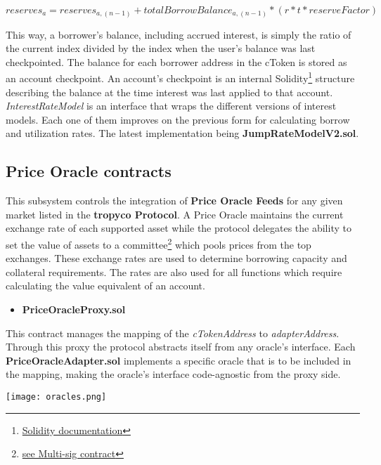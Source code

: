 \documentclass{article}
\begin{document}
\begin{center}
$reserves_{a}= reserves_{a,(n-1)}+ totalBorrowBalance_{a,(n-1)}*(r*t*reserveFactor)$
\end{center}

This way, a borrower's balance, including accrued interest, is simply the ratio of the current index divided by the index when the user's balance was last checkpointed. The balance for each borrower address in the cToken is stored as an account checkpoint. An account's checkpoint is an internal Solidity\footnote{\href{https://docs.soliditylang.org/en/v0.8.1/}{Solidity documentation}} structure describing the balance at the time interest was last applied to that account.
\\
\textit{InterestRateModel} is an interface that wraps the different versions of interest models. Each one of them improves on the previous form for calculating borrow and utilization rates. The latest implementation being \textbf{JumpRateModelV2.sol}.


\subsection{Price Oracle contracts}
This subsystem controls the integration of \textbf{Price Oracle Feeds} for any given market listed in the \textbf{tropyco Protocol}. A Price Oracle maintains the current exchange rate of each supported asset while the protocol delegates the ability to set the value of assets to a committee\footnote{\href{https://tropyco.app/docs/security}{see Multi-sig contract}} which pools prices from the top exchanges. These exchange rates are used to determine borrowing capacity and collateral requirements. The rates are also used for all functions which require calculating the value equivalent of an account.

\begin{itemize}
\item\textbf{PriceOracleProxy.sol}
\end{itemize}

This contract manages the mapping of the \textit{cTokenAddress} to \textit{adapterAddress}. Through this proxy the protocol abstracts itself from any oracle's interface. Each \textbf{PriceOracleAdapter.sol} implements a specific oracle that is to be included in the mapping, making the oracle's interface code-agnostic from the proxy side.

\begin{center}
\texttt{[image: oracles.png]}
\end{center}
\end{document}
